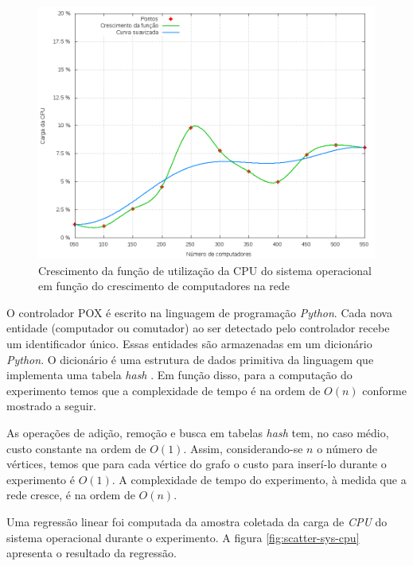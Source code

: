 \begin{figure}[!htb]
    \centering
    \label{fig:sys-cpu-growth}
    \includegraphics[width=\linewidth]{img/sys-cpu-growth}
    \caption{Crescimento da função de utilização da CPU do sistema operacional
    em função do crescimento de computadores na rede}
\end{figure}

O controlador POX é escrito na linguagem de programação \emph{Python}.
Cada nova entidade (computador ou comutador) ao ser detectado pelo controlador
recebe um identificador único.
Essas entidades são armazenadas em um dicionário \emph{Python}.
O dicionário é uma estrutura de dados primitiva da linguagem que implementa
uma tabela \emph{hash} \citep{maurer1975hash}.
Em função disso, para a computação do experimento temos que a complexidade 
de tempo é na ordem de $O(n)$ conforme mostrado a seguir.

As operações de adição, remoção e busca em tabelas \emph{hash} tem, no 
caso médio, custo constante na ordem de $O(1)$.
Assim, considerando-se $n$ o número de vértices, temos que para cada 
vértice do grafo o custo para inserí-lo durante o experimento é $O(1)$.
A complexidade de tempo do experimento, à medida que a rede cresce, é na 
ordem de $O(n)$.

Uma regressão linear foi computada da amostra coletada da carga de \emph{CPU}
do sistema operacional durante o experimento. 
A figura \ref{fig:scatter-sys-cpu} apresenta o resultado da regressão.

